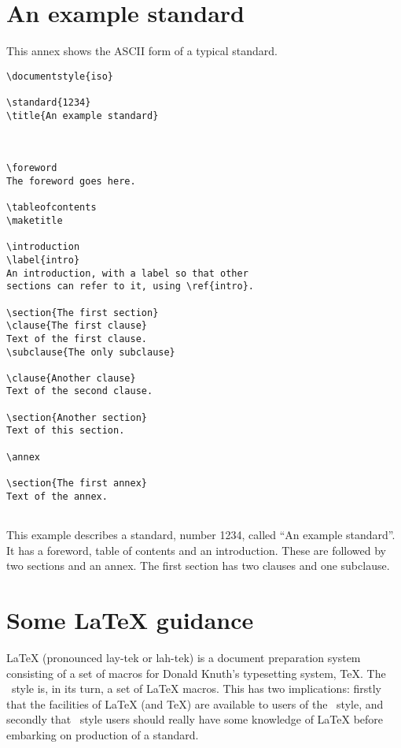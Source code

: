 \annex

\section{An example standard}
\label{annex.example}
This annex shows the ASCII form of a typical standard.

\begin{verbatim}
\documentstyle{iso}

\standard{1234}
\title{An example standard}



\foreword
The foreword goes here.

\tableofcontents
\maketitle

\introduction
\label{intro}
An introduction, with a label so that other
sections can refer to it, using \ref{intro}.

\section{The first section}
\clause{The first clause}
Text of the first clause.
\subclause{The only subclause}

\clause{Another clause}
Text of the second clause.

\section{Another section}
Text of this section.

\annex

\section{The first annex}
Text of the annex.


\end{verbatim}

This example describes a standard, number 1234, called ``An example
standard''.
It has a foreword, table of contents and an introduction.
These are followed by two sections and an annex.
The first section  has two clauses and one subclause.

\section{Some LaTeX guidance}
LaTeX (pronounced lay-tek or lah-tek) is a document preparation system
consisting of a set of macros for Donald Knuth's typesetting system, TeX.
The \iso\ style is, in its turn, a set of LaTeX macros.
This has two implications: firstly that the facilities of LaTeX (and TeX) are
available to users of the \iso\ style, and secondly that \iso\ style users
should really have some knowledge of LaTeX before embarking on production of
a standard.

